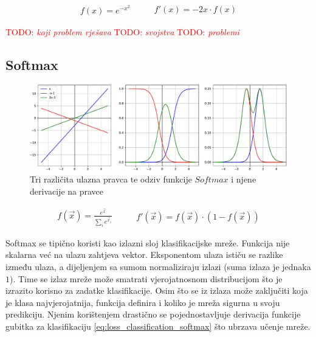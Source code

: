\documentclass[times, utf8, numeric, diplomski]{fer}
\def\TODO#1{\noindent\textcolor{red}{TODO: \textit{#1}}\newline}
\def\todo#1{\TODO{#1}}
\begin{document}
\begin{equation}
\label{eq:gauss}
\begin{split}
f(x) = e^{-x^2}
\end{split}
\qquad
\begin{split}
f'(x) = -2x \cdot f(x)
\end{split}
\end{equation}

\todo{koji problem rješava}
\todo{svojstva}
\todo{problemi}
\fi %

\subsection{Softmax}

\begin{figure}[H]
\includegraphics[width=\textwidth]{func_Softmax.pdf}
\centering
\caption{Tri različita ulazna pravca te odziv funkcije $Softmax$ i njene derivacije na pravce}
\label{fig:softmax}
\end{figure}

\begin{equation}
\label{eq:softmax}
\begin{split}
f(\vec{x}) = \frac{e^{\vec{x}}}{\sum_ie^{\vec{x}_i}}
\end{split}
\qquad
\begin{split}
f'(\vec{x}) = f(\vec{x}) \cdot (1-f(\vec{x}))
\end{split}
\end{equation}

Softmax se tipično koristi kao izlazni sloj klasifikacijske mreže. Funkcija nije skalarna već na ulazu zahtjeva vektor. Eksponentom ulaza ističu se razlike između ulaza, a dijeljenjem sa sumom normaliziraju izlazi (suma izlaza je jednaka $1$). Time se izlaz mreže može smatrati vjerojatnosnom distribucijom što je izrazito korisno za zadatke klasifikacije. Osim što se iz izlaza može zaključiti koja je klasa najvjerojatnija, funkcija definira i koliko je mreža sigurna u svoju predikciju. Njenim korištenjem drastično se pojednostavljuje derivacija funkcije gubitka za klasifikaciju \eqref{eq:loss_classification_softmax} što ubrzava učenje mreže.
\end{document}
